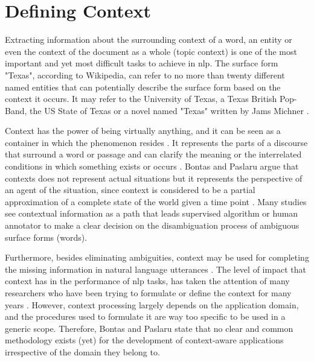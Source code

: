 \section{Defining Context}
\label{background:defininf_context}
Extracting information about the surrounding context of a word, an entity or even the context of the document as a whole (topic context) is one of the most important and yet most difficult tasks to achieve in \ac{nlp}. The surface form "Texas", according to Wikipedia, can refer to no more than twenty different named entities that can potentially describe the surface form based on the context it occurs. It may refer to the University of Texas, a Texas British Pop-Band, the US State of Texas or a novel named "Texas" written by Jams Michner \cite{24}. 

Context has the power of being virtually anything, and it can be seen as a container in which the phenomenon resides \cite{25}. It represents the parts of a discourse that surround a word or passage and can clarify the meaning or the interrelated conditions in which something exists or occurs \cite{22}. Bontas and Paslaru \cite{22} argue that contexts does not represent actual situations but it represents the perspective of an agent of the situation, since context is considered to be a partial approximation of a complete state of the world given a time point \cite{22,25}. Many studies see contextual information as a path that leads supervised algorithm or human annotator to make a clear decision on the disambiguation process of ambiguous surface forms (words). 

Furthermore, besides eliminating ambiguities, context may be used for completing the missing information in natural language utterances \cite{22}. The level of impact that context has in the performance of \ac{nlp} tasks, has taken the attention of many researchers who have been trying to formulate or define the context for many years \cite{35,37,28,29,26,38}. However, context processing largely depends on the application domain, and the procedures used to formulate it are way too specific to be used in a generic scope. Therefore, Bontas and Paslaru \cite{22} state that no clear and common methodology exists (yet) for the development of context-aware applications irrespective of the domain they belong to.   

